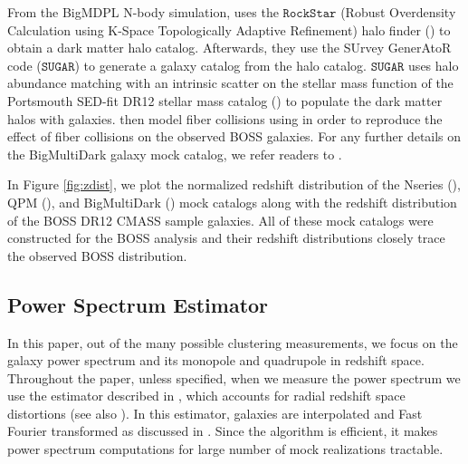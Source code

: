 From the BigMDPL N-body simulation, \cite{Rodriguez-Torres:2015aa} uses 
the $\mathtt{RockStar}$ (Robust Overdensity Calculation using K-Space Topologically 
Adaptive Refinement) halo finder (\citealt{Behroozi:2013aa}) to obtain 
a dark matter halo catalog. Afterwards, they use the 
SUrvey GenerAtoR code ($\mathtt{SUGAR}$) to generate a galaxy catalog from the halo 
catalog. $\mathtt{SUGAR}$ uses halo abundance matching with an intrinsic scatter 
on the stellar mass function of the Portsmouth SED-fit DR12 stellar mass
catalog (\citealt{Maraston:2013aa}) to populate the dark matter halos with  
galaxies. \cite{Rodriguez-Torres:2015aa} then model fiber collisions using 
\cite{Guo:2012aa} in order to reproduce the effect of fiber collisions on 
the observed BOSS galaxies. For any further details on the BigMultiDark 
galaxy mock catalog, we refer readers to \cite{Rodriguez-Torres:2015aa}.

In Figure \ref{fig:zdist}, we plot the normalized redshift distribution of the 
Nseries (\nseriescolor), QPM (\qpmcolor), and BigMultiDark (\bmdcolor) 
mock catalogs along with the redshift distribution of the BOSS DR12 
CMASS sample galaxies. All of these mock catalogs were constructed
for the BOSS analysis and their redshift distributions closely 
trace the observed BOSS distribution.


\subsection{Power Spectrum Estimator} \label{sec:pk_est}
In this paper, out of the many possible clustering measurements, we focus on the 
galaxy power spectrum and its monopole and quadrupole in redshift space. 
Throughout the paper, unless specified, when we measure the 
power spectrum we use the estimator described in \cite{Scoccimarro:2015aa}, 
which accounts for radial redshift space distortions (see also \citealt{Bianchi:2015aa}). 
In this estimator, galaxies are interpolated and Fast Fourier 
transformed as discussed in \cite{Sefusatti:2016aa}. 
Since the algorithm is efficient, it makes power spectrum computations 
for large number of mock realizations tractable.

